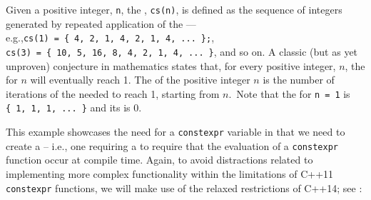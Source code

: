 \noindent Given a positive integer, \lstinline!n!, the ,
\lstinline!cs(n)!, is defined as the sequence of integers generated by
repeated application of the  --- e.g.,\linebreak[4]%
 \lstinline!cs(1)!~\lstinline!=!~\lstinline!{!~\lstinline!4,!~\lstinline!2,!~\lstinline!1,!~\lstinline!4,!~\lstinline!2,!~\lstinline!1,!~\lstinline!4,!~\lstinline!...!~\lstinline!};!,
\lstinline!cs(3)!~\lstinline!=!~\lstinline!{!~\lstinline!10,!~\lstinline!5,!~\lstinline!16,!~\lstinline!8,!~\lstinline!4,!~\lstinline!2,!~\lstinline!1,!~\lstinline!4,!~\lstinline!...!~\lstinline!}!,
and so on. A classic (but as yet unproven) conjecture in mathematics
states that, for every positive integer, $n$, the  for $n$ will eventually reach 1. The  of
the positive integer $n$ is the number of iterations of the
 needed to reach 1, starting from $n$.~Note that
the  for \lstinline!n!~\lstinline!=!~\lstinline!1! is
\lstinline!{!~\lstinline!1,!~\lstinline!1,!~\lstinline!1,!~\lstinline!...!~\lstinline!}!
and its  is 0.

This example showcases the need for a \lstinline!constexpr! variable in
that we need to create a  -- i.e., one
requiring a  to require that the
evaluation of a \lstinline!constexpr! function occur at compile time.
Again, to avoid distractions related to implementing more complex
functionality within the limitations of C++11 \lstinline!constexpr!
functions, we will make use of the relaxed restrictions of C++14; see
:

